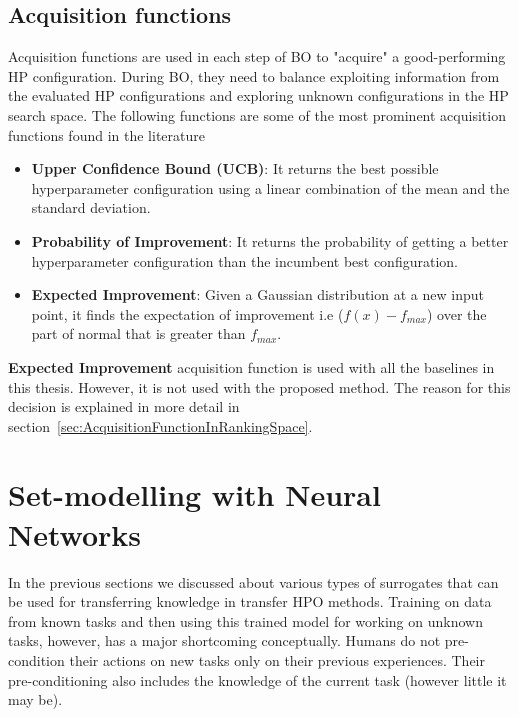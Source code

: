 \documentclass[12pt, twoside, ngerman]{report}
\begin{document}

 

\subsection{Acquisition functions}
Acquisition functions are used in each step of BO to "acquire" a good-performing HP configuration.
During BO, they need to balance exploiting information from the evaluated HP configurations and exploring unknown configurations in the HP search space.
The following functions are some of the most prominent acquisition functions found in the literature~\cite{GPTutorial}
\begin{itemize}
\item \textbf{Upper Confidence Bound (UCB)}: It returns the best possible hyperparameter configuration using a linear combination of the mean and the standard deviation.
\item \textbf{Probability of Improvement}: It returns the probability of getting a better hyperparameter configuration than the incumbent best configuration.
\item \textbf{Expected Improvement}: Given a Gaussian distribution at a new input point, it finds the expectation of improvement i.e ($f(x) - f_{max}$) over the part of normal that is greater than $f_{max}$.
\end{itemize}

 \textbf{Expected Improvement} acquisition function is used with all the baselines in this thesis. However, it is not used with the proposed method. The reason for this decision is explained in more detail in section~\ref{sec:AcquisitionFunctionInRankingSpace}.


\section{Set-modelling with Neural Networks}

In the previous sections we discussed about various types of surrogates that can be used for transferring knowledge in transfer HPO methods.
Training on data from known tasks and then using this trained model for working on unknown tasks, however,  has a major shortcoming conceptually.
Humans do not pre-condition their actions on new tasks only on their previous experiences.
Their pre-conditioning also includes the knowledge of the current task (however little it may be).
\end{document}
